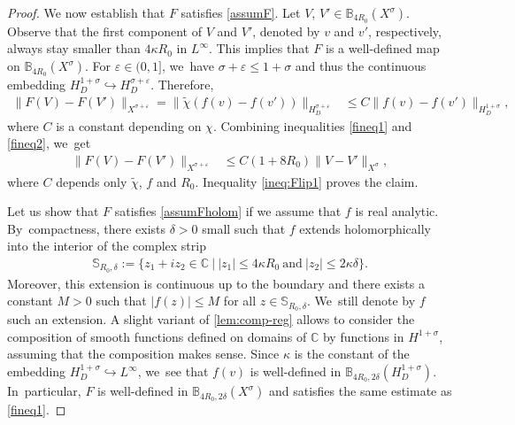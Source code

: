 \documentclass[10pt]{amsart}
\theoremstyle{definition}
\let\veps\varepsilon
\providecommand{\norm}[1]{\lVert#1\rVert}
\begin{document}
\begin{proof}
We now establish that $F$ satisfies \cref{assumF}. Let $V$, $V'\in \mathbb{B}_{4R_0}(X^\sigma)$. Observe that the first component of $V$ and $V'$, denoted by $v$ and $v'$, respectively, always stay smaller than $4\kappa R_0$ in $L^{\infty}$. This implies that $F$ is a well-defined map on $\mathbb{B}_{4R_0}(X^\sigma)$. For $\veps\in (0, 1]$, we~have $\sigma+\veps\leq 1+\sigma$ and thus the continuous embedding $H_D^{1+\sigma}\hookrightarrow H_D^{\sigma+\veps}$. Therefore,
\begin{align}\label{fineq2}
\norm{F(V)-F(V')}_{X^{\sigma+\veps}}=\norm{\widetilde{\chi}(f(v)-f(v'))}_{H_D^{\sigma+\veps}}&\leq C\norm{f(v)-f(v')}_{H_D^{1+\sigma}},
\end{align}
where $C$ is a constant depending on $\chi$. Combining inequalities \eqref{fineq1} and \eqref{fineq2}, we~get
\begin{align}\label{ineq:Flip1}
\norm{F(V)-F(V')}_{X^{\sigma+\veps}}&\leq C(1+8R_0)\norm{V-V'}_{X^\sigma},
\end{align}
where $C$ depends only $\widetilde{\chi}$, $f$ and $R_0$. Inequality \eqref{ineq:Flip1} proves the claim.

Let us show that $F$ satisfies \cref{assumFholom} if we assume that $f$ is real analytic. By~compactness, there exists $\delta>0$ small such that $f$ extends holomorphically into the interior of the complex strip
\begin{align*}
\mathbb{S}_{R_0, \delta}:=\{z_1+iz_2\in \mathbb{C}\ |\ |z_1|\leq 4\kappa R_0\ \text{and}\ |z_2|\leq 2\kappa \delta\}.
\end{align*}
Moreover, this extension is continuous up to the boundary and there exists a constant $M>0$ such that $|f(z)|\leq M$ for all $z\in \mathbb{S}_{R_0, \delta}$. We~still denote by $f$ such an extension. A slight variant of \cref{lem:comp-reg} allows to consider the composition of smooth functions defined on domains of $\mathbb{C}$ by functions in $H^{1+\sigma}$, assuming that the composition makes sense. Since $\kappa$ is the constant of the embedding $H_D^{1+\sigma}\hookrightarrow L^\infty$, we~see that $f(v)$ is well-defined in $\mathbb{B}_{4R_0, 2\delta}(H^{1+\sigma}_D)$. In~particular, $F$ is well-defined in $\mathbb{B}_{4R_0, 2\delta}(X^\sigma)$ and satisfies the same estimate as \eqref{fineq1}.


\end{proof}
\end{document}
